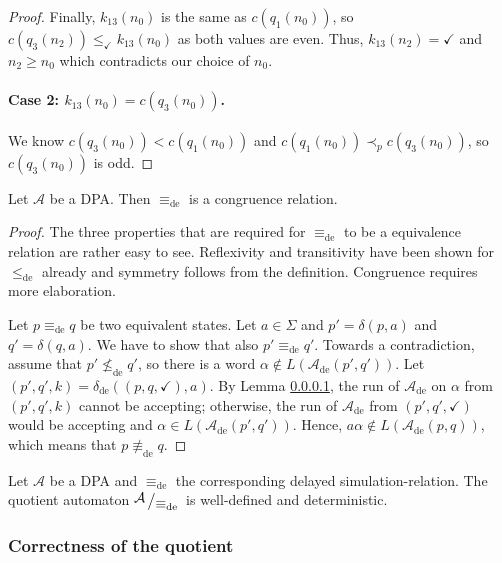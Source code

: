 \begin{proof}
	Finally, $k_{13}(n_0)$ is the same as $c(q_1(n_0))$, so $c(q_3(n_2)) \leq_\checkmark k_{13}(n_0)$ as both values are even. Thus, $k_{13}(n_2) = \checkmark$ and $n_2 \geq n_0$ which contradicts our choice of $n_0$.
	
	\paragraph{Case 2: $k_{13}(n_0) = c(q_3(n_0))$.} We know $c(q_3(n_0)) < c(q_1(n_0))$ and $c(q_1(n_0)) \prec_p c(q_3(n_0))$, so $c(q_3(n_0))$ is odd. %
\end{proof}

\begin{lem}
	Let $\mathcal{A}$ be a DPA. Then $\equiv_\text{de}$ is a congruence relation.
\end{lem}

\begin{proof}
	The three properties that are required for $\equiv_\text{de}$ to be a equivalence relation are rather easy to see. Reflexivity and transitivity have been shown for $\leq_\text{de}$ already and symmetry follows from the definition. Congruence requires more elaboration.

	Let $p \equiv_\text{de} q$ be two equivalent states. Let $a \in \Sigma$ and $p' = \delta(p, a)$ and $q' = \delta(q, a)$. We have to show that also $p' \equiv_\text{de} q'$. Towards a contradiction, assume that $p' \not\leq_\text{de} q'$, so there is a word $\alpha \notin L(\mathcal{A}_\text{de}(p', q'))$. Let $(p', q', k) = \delta_\text{de}((p, q, \checkmark), a)$. By Lemma \ref{}, the run of $\mathcal{A}_\text{de}$ on $\alpha$ from $(p', q', k)$ cannot be accepting; otherwise, the run of $\mathcal{A}_\text{de}$ from $(p', q', \checkmark)$ would be accepting and $\alpha \in L(\mathcal{A}_\text{de}(p', q'))$. Hence, $a \alpha \notin L(\mathcal{A}_\text{de}(p, q))$, which means that $p \not\equiv_\text{de} q$.
\end{proof}

\begin{cor}
	Let $\mathcal{A}$ be a DPA and $\equiv_\text{de}$ the corresponding delayed simulation-relation. The quotient automaton $\bigslant{\mathcal{A}}{\equiv_\text{de}}$ is well-defined and deterministic.
\end{cor}

\subsubsection*{Correctness of the quotient}













